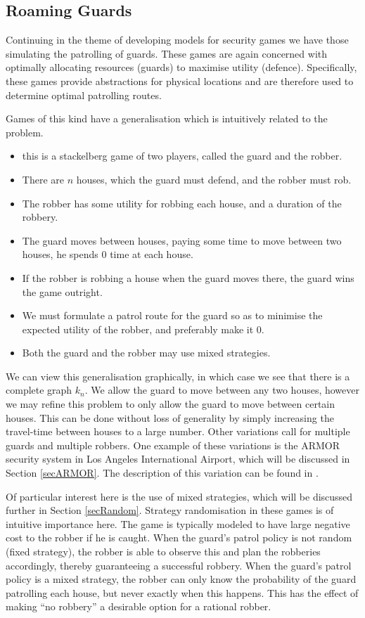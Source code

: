 \documentclass{article}
\begin{document}
\subsection{Roaming Guards}

Continuing in the theme of developing models for security games we have those simulating the patrolling of guards.
These games are again concerned with optimally allocating resources (guards) to maximise utility (defence).
Specifically, these games provide abstractions for physical locations and are therefore used to determine optimal patrolling routes.

Games of this kind have a generalisation which is intuitively related to the problem.
\begin{itemize}
	\item this is a stackelberg game of two players, called the guard and the robber.
	\item There are $n$ houses, which the guard must defend, and the robber must rob.
	\item The robber has some utility for robbing each house, and a duration of the robbery.
	\item The guard moves between houses, paying some time to move between two houses, he spends 0 time at each house.
	\item If the robber is robbing a house when the guard moves there, the guard wins the game outright.
	\item We must formulate a patrol route for the guard so as to minimise the expected utility of the robber, and preferably make it 0.
	\item Both the guard and the robber may use mixed strategies.
\end{itemize}

We can view this generalisation graphically, in which case we see that there is a complete graph $k_n$.
We allow the guard to move between any two houses, however we may refine this problem to only allow the guard to move between certain houses.
This can be done without loss of generality by simply increasing the travel-time between houses to a large number.
Other variations call for multiple guards and multiple robbers.
One example of these variations is the ARMOR security system in Los Angeles International Airport, which will be discussed in Section \ref{secARMOR}.
The description of this variation can be found in \cite{random}.

Of particular interest here is the use of mixed strategies, which will be discussed further in Section \ref{secRandom}.
Strategy randomisation in these games is of intuitive importance here.
The game is typically modeled to have large negative cost to the robber if he is caught.
When the guard's patrol policy is not random (fixed strategy), the robber is able to observe this and plan the robberies accordingly, thereby guaranteeing a successful robbery.
When the guard's patrol policy is a mixed strategy, the robber can only know the probability of the guard patrolling each house, but never exactly when this happens.
This has the effect of making ``no robbery'' a desirable option for a rational robber.
\end{document}
